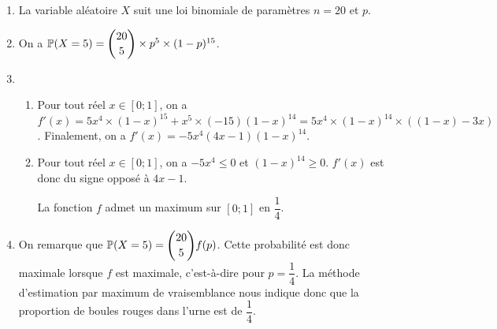 \documentclass[11pt,fleqn, openany]{book} %
\begin{document}
\begin{solution}\hspace{0pt}
\begin{enumerate}
\item La variable aléatoire $X$ suit une loi binomiale de paramètres $n=20$ et $p$.
\item On a $\mathbb{P}(X=5)=\dbinom{20}{5} \times p^5 \times (1-p)^{15}$.
\item 
\begin{enumerate}
\item Pour tout réel $x\in [0;1]$, on a $f'(x)=5x^4 \times (1-x)^{15}+x^5\times (-15)(1-x)^{14}=5x^4 \times (1-x)^{14} \times ((1-x)-3x)$. Finalement, on a $f'(x)=-5x^4(4x-1)(1-x)^{14}$.
\item Pour tout réel $x\in [0;1]$, on a $-5x^4 \leqslant 0$ et $(1-x)^{14}\geqslant 0$. $f'(x)$ est donc du signe opposé à $4x-1$.

\begin{center}
\end{center}

La fonction $f$ admet un maximum sur $[0;1]$ en $\dfrac{1}{4}$.

\end{enumerate}
\item On remarque que $\mathbb{P}(X=5)= \dbinom{20}{5}f(p)$. Cette probabilité est donc maximale lorsque $f$ est maximale, c'est-à-dire pour $p=\dfrac{1}{4}$. La méthode d'estimation par maximum de vraisemblance nous indique donc que la proportion de boules rouges dans l'urne est de $\dfrac{1}{4}$.
\end{enumerate}
\end{solution}
\end{document}
